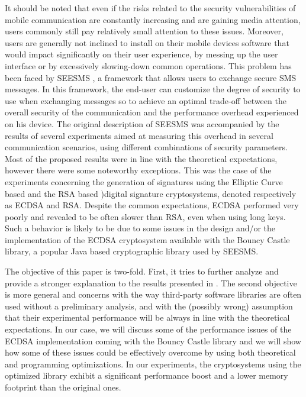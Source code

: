 \documentclass[authoryear]{elsarticle}
\begin{document}
It should be noted that even if the risks related to the security vulnerabilities of mobile communication are constantly increasing and are gaining media attention, users commonly still pay relatively small attention to these issues. Moreover, users are generally not inclined to install on their mobile devices software that would impact significantly on their user experience, by messing up the user interface or by excessively slowing-down common operations. 
This problem has been faced by SEESMS \citep{SEESMS}, a framework that allows users to exchange secure SMS messages. In this framework, the end-user can customize the degree of security to use when exchanging messages so to achieve an optimal trade-off between the overall security of the communication and the performance overhead experienced on his device.  The original description of SEESMS was accompanied by the results of several experiments aimed at measuring this overhead in several communication scenarios, using different combinations of security parameters. Most of the proposed results were in line with the theoretical expectations, however there were some noteworthy exceptions. This was the case of the experiments concerning the generation of signatures using the Elliptic Curve based  \citep{JohnsonMV01} and the RSA based \citep{Rivest78amethod})digital signature cryptosystems, denoted respectively as ECDSA and RSA. Despite the common expectations, ECDSA performed very poorly  and revealed to be often slower than RSA, even when using long keys. Such a behavior is likely to be due to some issues in the design and/or the implementation of the ECDSA cryptosystem available with the Bouncy Castle library, a popular Java based cryptographic library used by SEESMS.

The objective of this paper is two-fold. First, it tries to further analyze and provide a stronger explanation to the results presented in  \citep{SEESMS}. The second objective is more general and concerns with the way third-party software libraries are often used without a preliminary analysis, and with the (possibly wrong) assumption that their experimental performance will be always in line with the theoretical expectations. In our case, we will discuss some of the performance issues of the ECDSA implementation coming with the Bouncy Castle library and we will show how some of these issues could be effectively overcome by using both theoretical and programming optimizations. In our experiments, the cryptosystems using the optimized library exhibit a significant performance boost and a lower memory footprint than the original ones.
\end{document}
